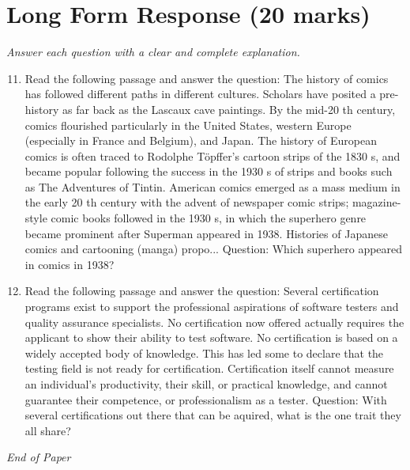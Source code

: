\documentclass[12pt]{article}
\begin{document}
\section*{Long Form Response (20 marks)}
\textit{Answer each question with a clear and complete explanation.}
\begin{enumerate}[label=\arabic*.]
\setcounter{enumi}{10}
\item Read the following passage and answer the question: The history of comics has followed different paths in different cultures. Scholars have posited a pre-history as far back as the Lascaux cave paintings. By the mid-20 th century, comics flourished particularly in the United States, western Europe (especially in France and Belgium), and Japan. The history of European comics is often traced to Rodolphe Töpffer's cartoon strips of the 1830 s, and became popular following the success in the 1930 s of strips and books such as The Adventures of Tintin. American comics emerged as a mass medium in the early 20 th century with the advent of newspaper comic strips; magazine-style comic books followed in the 1930 s, in which the superhero genre became prominent after Superman appeared in 1938. Histories of Japanese comics and cartooning (manga) propo... Question: Which superhero appeared in comics in 1938?
\item Read the following passage and answer the question: Several certification programs exist to support the professional aspirations of software testers and quality assurance specialists. No certification now offered actually requires the applicant to show their ability to test software. No certification is based on a widely accepted body of knowledge. This has led some to declare that the testing field is not ready for certification. Certification itself cannot measure an individual's productivity, their skill, or practical knowledge, and cannot guarantee their competence, or professionalism as a tester. Question: With several certifications out there that can be aquired, what is the one trait they all share?
\end{enumerate}

\vfill
\noindent\textit{End of Paper}
\end{document}
